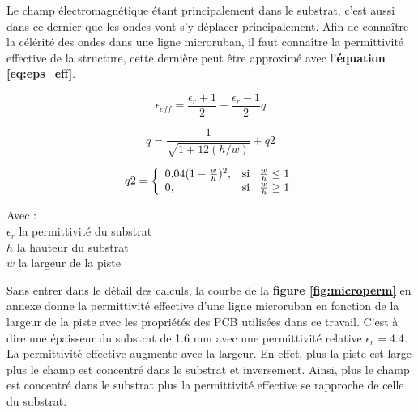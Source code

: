 \documentclass[12pt]{article}
\begin{document}
\vspace{0.5cm}
Le champ électromagnétique étant principalement dans le substrat, c'est aussi dans ce dernier que les ondes vont s'y déplacer principalement. Afin de connaître la célérité des ondes dans une ligne microruban, il faut connaître la permittivité effective de la structure, cette dernière peut être approximé avec l'\textbf{équation \ref{eq:eps_eff}}.

\vspace{0.5cm}
{\large
\begin{equation}
\epsilon_{eff} = \frac{\epsilon_r+1}{2} + \frac{\epsilon_r-1}{2}q 
\label{eq:eps_eff}
\end{equation}}

\vspace{0.5cm}
{\large
\begin{equation}
q = \frac{1}{\sqrt{1+12(h/w)}}+q2 
\label{eq:q}
\end{equation}}

\vspace{0.5cm}
{\large
\begin{equation}
q2 = \left\{
\begin{array}{ll}
  0.04(1-\frac{w}{h})^2, & \text{si} \hspace{0.3cm}\frac{w}{h}\leq 1 \\
  0, & \text{si} \hspace{0.3cm}\frac{w}{h}\geq 1
\end{array}
\right.
\label{eq:q2}
\end{equation}}
\vspace{1cm}

Avec : \\
$\epsilon_r$ la permittivité du substrat\\
$h$ la hauteur du substrat\\
$w$ la largeur de la piste

\vspace{1cm}
Sans entrer dans le détail des calculs, la courbe de la \textbf{figure \ref{fig:microperm}} en annexe donne la permittivité effective d'une ligne microruban en fonction de la largeur de la piste avec les propriétés des PCB utilisées dans ce travail. C'est à dire une épaisseur du substrat de 1.6 mm avec une permittivité relative $\epsilon_r=4.4$. La permittivité effective augmente avec la largeur. En effet, plus la piste est large plus le champ est concentré dans le substrat et inversement. Ainsi, plus le champ est concentré dans le substrat plus la permittivité effective se rapproche de celle du substrat.
\end{document}
